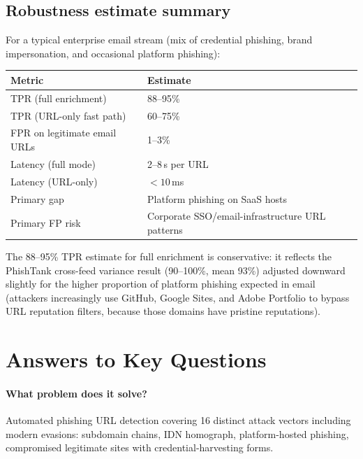 \documentclass[11pt,a4paper]{article}
\begin{document}
\subsection*{Robustness estimate summary}

For a typical enterprise email stream (mix of credential phishing,
brand impersonation, and occasional platform phishing):

\begin{center}
\renewcommand{\arraystretch}{1.3}
\begin{tabular}{ll}
\toprule
Metric & Estimate \\
\midrule
TPR (full enrichment) & 88--95\% \\
TPR (URL-only fast path) & 60--75\% \\
FPR on legitimate email URLs & 1--3\% \\
Latency (full mode) & 2--8\,s per URL \\
Latency (URL-only) & $< 10$\,ms \\
Primary gap & Platform phishing on SaaS hosts \\
Primary FP risk & Corporate SSO/email-infrastructure URL patterns \\
\bottomrule
\end{tabular}
\end{center}

The 88--95\% TPR estimate for full enrichment is conservative: it
reflects the PhishTank cross-feed variance result (90--100\%, mean
93\%) adjusted downward slightly for the higher proportion of
platform phishing expected in email (attackers increasingly use
GitHub, Google Sites, and Adobe Portfolio to bypass URL reputation
filters, because those domains have pristine reputations).

\section{Answers to Key Questions}

\paragraph{What problem does it solve?}
Automated phishing URL detection covering 16 distinct attack vectors
including modern evasions: subdomain chains, IDN homograph,
platform-hosted phishing, compromised legitimate sites with
credential-harvesting forms.
\end{document}
